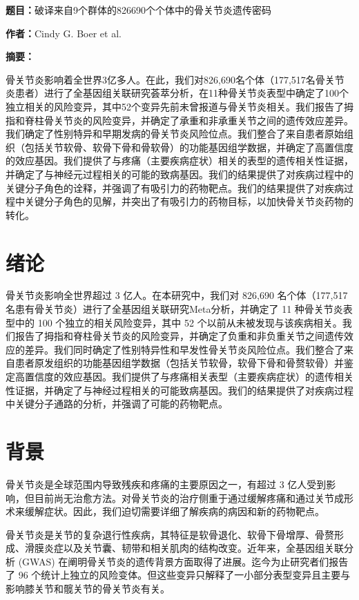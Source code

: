 
{\noindent\textbf{题目：}破译来自9个群体的826690个个体中的骨关节炎遗传密码

\noindent \textbf{作者：}Cindy G. Boer et al.

\noindent\textbf{摘要：}}骨关节炎影响着全世界3亿多人。在此，我们对826,690名个体（177,517名骨关节炎患者）进行了全基因组关联研究荟萃分析，在11种骨关节炎表型中确定了100个独立相关的风险变异，其中52个变异先前未曾报道与骨关节炎相关。我们报告了拇指和脊柱骨关节炎的风险变异，并确定了承重和非承重关节之间的遗传效应差异。我们确定了性别特异和早期发病的骨关节炎风险位点。我们整合了来自患者原始组织（包括关节软骨、软骨下骨和骨软骨）的功能基因组学数据，并确定了高置信度的效应基因。我们提供了与疼痛（主要疾病症状）相关的表型的遗传相关性证据，并确定了与神经元过程相关的可能的致病基因。我们的结果提供了对疾病过程中的关键分子角色的诠释，并强调了有吸引力的药物靶点。我们的结果提供了对疾病过程中关键分子角色的见解，并突出了有吸引力的药物目标，以加快骨关节炎药物的转化。


\section*{绪论}

骨关节炎影响全世界超过 3 亿人。在本研究中，我们对 826,690
名个体（177,517 名患有骨关节炎）进行了全基因组关联研究Meta分析，并确定了
11 种骨关节炎表型中的 100 个独立的相关风险变异，其中 52
个以前从未被发现与该疾病相关。我们报告了拇指和脊柱骨关节炎的风险变异，并确定了负重和非负重关节之间遗传效应的差异。我们同时确定了性别特异性和早发性骨关节炎风险位点。我们整合了来自患者原发组织的功能基因组学数据（包括关节软骨，软骨下骨和骨赘软骨）并鉴定高置信度的效应基因。我们提供了与疼痛相关表型（主要疾病症状）的遗传相关性证据，并确定了与神经过程相关的可能致病基因。我们的结果提供了对疾病过程中关键分子通路的分析，并强调了可能的药物靶点。


\section*{背景}

骨关节炎是全球范围内导致残疾和疼痛的主要原因之一，有超过 3
亿人受到影响，但目前尚无治愈方法。对骨关节炎的治疗侧重于通过缓解疼痛和通过关节成形术来缓解症状。因此，我们迫切需要详细了解疾病的病因和新的药物靶点。

骨关节炎是关节的复杂退行性疾病，其特征是软骨退化、软骨下骨增厚、骨赘形成、滑膜炎症以及关节囊、韧带和相关肌肉的结构改变。近年来，全基因组关联分析
(GWAS) 在阐明骨关节炎的遗传背景方面取得了进展。迄今为止研究者们报告了 96
个统计上独立的风险变体。但这些变异只解释了一小部分表型变异且主要与影响膝关节和髋关节的骨关节炎有关。

